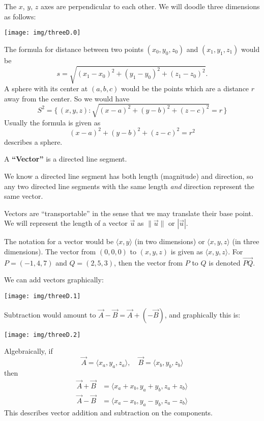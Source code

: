 
The $x$, $y$, $z$ axes are perpendicular to each other. We will
doodle three dimensions as follows:
\begin{center}
\texttt{[image: img/threeD.0]}
\end{center}
The formula for distance between two points $(x_{0}, y_{0},
z_{0})$ and $(x_{1},y_{1},z_{1})$ would be
\begin{equation}
s = \sqrt{(x_{1}-x_{0})^{2}+(y_{1}-y_{0})^{2}+(z_{1}-z_{0})^{2}}.
\end{equation}
A sphere with its center at $(a,b,c)$ would be the points which
are a distance $r$ away from the center. So we would have
\begin{equation}
S^{2} = \{\,(x,y,z) : \sqrt{(x-a)^{2}+(y-b)^{2}+(z-c)^{2}}=r\,\}
\end{equation}
Usually the formula is given as
\begin{equation}
(x-a)^{2}+(y-b)^{2}+(z-c)^{2}=r^{2}
\end{equation}
describes a sphere.

A \textbf{``Vector''} is a directed line segment.

We know a directed line segment has both length (magnitude) and
direction, so any two directed line segments with the same length
\emph{and} direction represent the same vector.

Vectors are ``transportable'' in the sense that we may translate
their base point. We will represent the length of a vector
$\vec{u}$ as $\|\vec{u}\|$ or $|\vec{u}|$.

The notation for a vector would be $\langle x,y\rangle$ (in two
dimensions) or $\langle x,y,z\rangle$ (in three dimensions). The
vector from $(0,0,0)$ to $(x,y,z)$ is given as $\langle x,y,z\rangle$.
For $P=(-1,4,7)$ and $Q=(2,5,3)$, then the vector from $P$ to $Q$
is denoted $\overrightarrow{PQ}$.

We can add vectors graphically:
\begin{center}
\texttt{[image: img/threeD.1]}
\end{center}
Subtraction would amount to $\vec{A}-\vec{B}=\vec{A}+(-\vec{B})$,
and graphically this is:
\begin{center}
\texttt{[image: img/threeD.2]}
\end{center}
Algebraically, if
\begin{equation}
\vec{A}=\langle x_{a},y_{a},z_{a}\rangle,\quad
\vec{B}=\langle x_{b},y_{b},z_{b}\rangle
\end{equation}
then
\begin{equation}
\begin{aligned}
\vec{A}+\vec{B} &= \langle x_{a}+x_{b}, y_{a}+y_{b},
z_{a}+z_{b}\rangle\\
\vec{A}-\vec{B} &= \langle x_{a}-x_{b}, y_{a}-y_{b},
z_{a}-z_{b}\rangle
\end{aligned}
\end{equation}
This describes vector addition and subtraction on the components.

